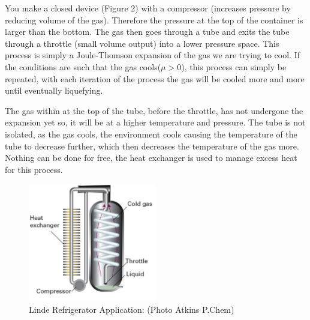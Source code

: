 \documentclass{article}
\begin{document}
You make a closed device (Figure 2) with a compressor (increases pressure by reducing volume of the gas). 
Therefore the pressure at the top of the container is larger than the bottom. 
The gas then goes through a tube and exits the tube through a throttle (small volume output) into a lower pressure space.
This process is simply a Joule-Thomson expansion of the gas we are trying to cool. 
If the conditions are such that the gas cools($\mu>$0), this process can simply be repeated, with each iteration of the process the gas will be cooled more and more until eventually liquefying. 

The gas within at the top of the tube, before the throttle, has not undergone the expansion yet so, it will be at a higher temperature and pressure. 
The tube is not isolated, as the gas cools, the environment cools causing the temperature of the tube to decrease further, which then decreases the temperature of the gas more. 
Nothing can be done for free, the heat exchanger is used to manage excess heat for this process. 

\begin{figure}[h!]
\centering
\caption{Linde Refrigerator Application: (Photo Atkins P.Chem)}
\includegraphics[width=0.5\textwidth]{Linde_ref.png}
\end{figure}
\end{document}
